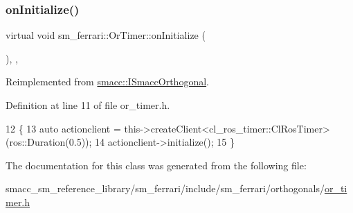 \subsubsection{\texorpdfstring{on\+Initialize()}{onInitialize()}}
{\footnotesize\ttfamily virtual void sm\+\_\+ferrari\+::\+Or\+Timer\+::on\+Initialize (\begin{DoxyParamCaption}{ }\end{DoxyParamCaption})\hspace{0.3cm}{\ttfamily [inline]}, {\ttfamily [override]}, {\ttfamily [virtual]}}



Reimplemented from \hyperlink{classsmacc_1_1ISmaccOrthogonal_a6bb31c620cb64dd7b8417f8705c79c7a}{smacc\+::\+I\+Smacc\+Orthogonal}.



Definition at line 11 of file or\+\_\+timer.\+h.


\begin{DoxyCode}
12     \{
13         \textcolor{keyword}{auto} actionclient = this->createClient<cl\_ros\_timer::ClRosTimer>(ros::Duration(0.5));
14         actionclient->initialize();
15     \}
\end{DoxyCode}


The documentation for this class was generated from the following file\+:\begin{DoxyCompactItemize}
\item 
smacc\+\_\+sm\+\_\+reference\+\_\+library/sm\+\_\+ferrari/include/sm\+\_\+ferrari/orthogonals/\hyperlink{sm__ferrari_2include_2sm__ferrari_2orthogonals_2or__timer_8h}{or\+\_\+timer.\+h}\end{DoxyCompactItemize}
